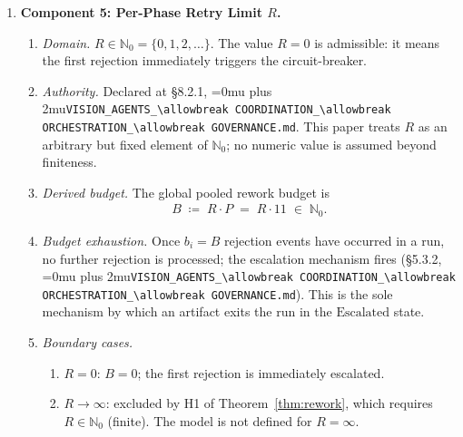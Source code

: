 \documentclass[12pt]{article}
\theoremstyle{definition}
\DeclareRobustCommand{\code}[1]{\begingroup\Urlmuskip=0mu plus 2mu\relax\nolinkurl{#1}\endgroup}
\newcommand{\VisionGov}{\code{VISION\_AGENTS\_\allowbreak COORDINATION\_\allowbreak ORCHESTRATION\_\allowbreak GOVERNANCE.md}}
\begin{document}
\begin{enumerate}
  \item \textbf{Component 5: Per-Phase Retry Limit $R$.}
  \begin{enumerate}
    \item[5.1] \emph{Domain.}
               $R \in \mathbb{N}_0 = \{0,1,2,\ldots\}$.
               The value $R = 0$ is admissible: it means the first
               rejection immediately triggers the circuit-breaker.
    \item[5.2] \emph{Authority.}
               Declared at \S8.2.1, \VisionGov{}.
               This paper treats $R$ as an arbitrary but fixed element
               of $\mathbb{N}_0$; no numeric value is assumed beyond
               finiteness.
    \item[5.3] \emph{Derived budget.}
               The global pooled rework budget is
               \begin{align}
                 B \;\coloneqq\; R \cdot P
                 \;=\; R \cdot 11
                 \;\in\; \mathbb{N}_0.
                 \label{eq:B-def}
               \end{align}
    \item[5.4] \emph{Budget exhaustion.}
               Once $b_i = B$ rejection events have occurred in a run,
               no further rejection is processed; the escalation
               mechanism fires (\S5.3.2, \VisionGov{}).
               This is the sole mechanism by which an artifact exits
               the run in the $\mathrm{Escalated}$ state.
    \item[5.5] \emph{Boundary cases.}
               \begin{enumerate}
                 \item[(a)] $R = 0$: $B = 0$; the first rejection is
                            immediately escalated.
                 \item[(b)] $R \to \infty$: excluded by H1 of
                            Theorem~\ref{thm:rework}, which requires
                            $R \in \mathbb{N}_0$ (finite).  The model
                            is not defined for $R = \infty$.
               \end{enumerate}
  \end{enumerate}


\end{enumerate}
\end{document}
